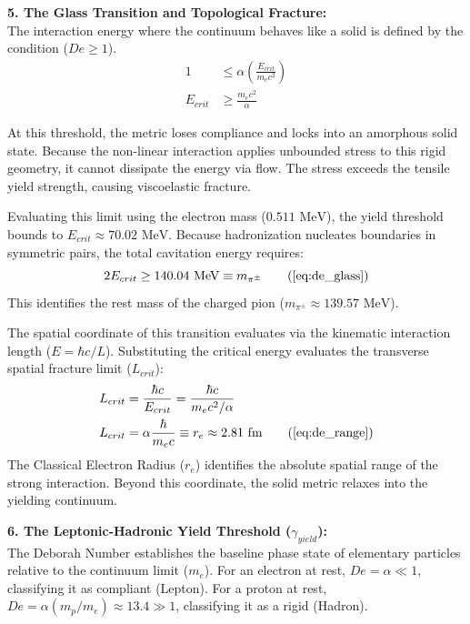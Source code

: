 \vspace{0.2 cm}

\textbf{5. The Glass Transition and Topological Fracture:} \\
The interaction energy where the continuum behaves like a solid is defined by the condition ($De \ge 1$).  
\begin{align}
    1 & \le \alpha \left( \frac{E_{crit}}{m_e c^2} \right) \\
    E_{crit} &\ge \frac{m_e c^2}{\alpha}
\end{align}

At this threshold, the metric loses compliance and locks into an amorphous solid state. Because the non-linear interaction applies unbounded stress to this rigid geometry, it cannot dissipate the energy via flow. The stress exceeds the tensile yield strength, causing viscoelastic fracture. 

Evaluating this limit using the electron mass ($0.511 \text{ MeV}$), the yield threshold bounds to $E_{crit} \approx 70.02 \text{ MeV}$. Because hadronization nucleates boundaries in symmetric pairs, the total cavitation energy requires:
\begin{equation}
    2 E_{crit} \ge 140.04 \text{ MeV} \equiv m_{\pi^{\pm}} \tag{\ref{eq:de_glass}}
\end{equation}
This identifies the rest mass of the charged pion ($m_{\pi^{\pm}} \approx 139.57 \text{ MeV}$). 

The spatial coordinate of this transition evaluates via the kinematic interaction length ($E = \hbar c / L$). Substituting the critical energy evaluates the transverse spatial fracture limit ($L_{crit}$): 
\begin{align}
    L_{crit} &= \frac{\hbar c}{E_{crit}} = \frac{\hbar c}{m_e c^2 / \alpha} \\
    L_{crit} &= \alpha \frac{\hbar}{m_e c} \equiv r_e \approx 2.81 \text{ fm} \tag{\ref{eq:de_range}}
\end{align}
The Classical Electron Radius ($r_e$) identifies the absolute spatial range of the strong interaction. Beyond this coordinate, the solid metric relaxes into the yielding continuum. 

\vspace{0.2 cm}

\textbf{6. The Leptonic-Hadronic Yield Threshold ($\gamma_{yield}$):} \\ 
The Deborah Number establishes the baseline phase state of elementary particles relative to the continuum limit ($m_e$). For an electron at rest, $De = \alpha \ll 1$, classifying it as compliant (Lepton). For a proton at rest, $De = \alpha (m_p/m_e) \approx 13.4 \gg 1$, classifying it as a rigid (Hadron). 

